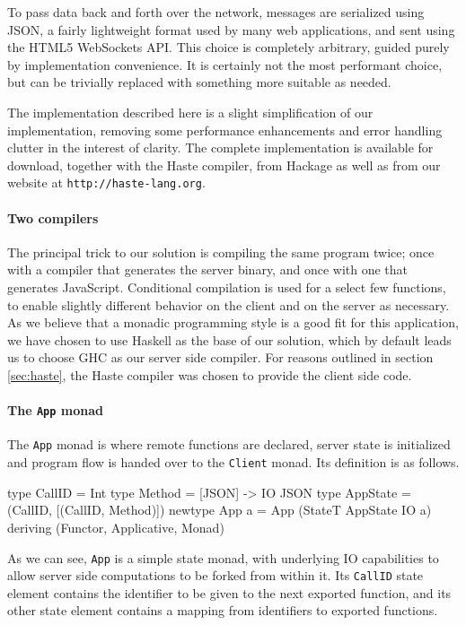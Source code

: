 \documentclass[preprint]{sigplanconf}
\begin{document}
To pass data back and forth over the network, messages are serialized using
JSON, a fairly lightweight format used by many web applications, and sent using
the HTML5 WebSockets API. This choice is completely arbitrary, guided purely
by implementation convenience. It is certainly not the most performant choice,
but can be trivially replaced with something more suitable as needed.

The implementation described here is a slight simplification of our
implementation, removing some performance enhancements and error handling
clutter in the interest of clarity. The complete implementation is available
for download, together with the Haste compiler, from Hackage as well as from
our website at \lstinline!http://haste-lang.org!.


\paragraph{Two compilers}
The principal trick to our solution is compiling the same program twice; once
with a compiler that generates the server binary, and once with one that
generates JavaScript. Conditional compilation is used for a select few
functions, to enable slightly different behavior on the client and on the
server as necessary. As we believe that a monadic programming style is a good
fit for this application, we have chosen to use Haskell as the base of our
solution, which by default leads us to choose GHC as our server side compiler.
For reasons outlined in section \ref{sec:haste}, the Haste compiler was chosen
to provide the client side code.

\paragraph{The \lstinline!App! monad}
The \lstinline!App! monad is where remote functions are declared, server state
is initialized and program flow is handed over to the \lstinline!Client! monad.
Its definition is as follows.

\begin{code}
type CallID = Int
type Method = [JSON] -> IO JSON
type AppState = (CallID, [(CallID, Method)])
newtype App a = App (StateT AppState IO a)
  deriving (Functor, Applicative, Monad)
\end{code}

As we can see, \lstinline!App! is a simple state monad, with underlying IO
capabilities to allow server side computations to be forked from within it.
Its \lstinline!CallID! state element contains the identifier to be given to the
next exported function, and its other state element contains a mapping from
identifiers to exported functions.
\end{document}
